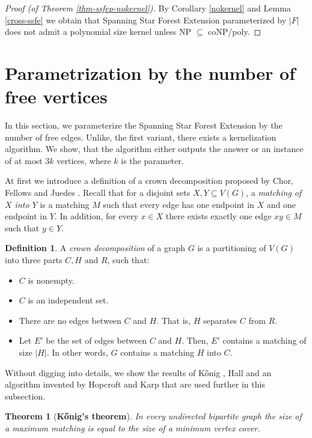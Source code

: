 \documentclass[en]{pracamgr}
\newtheorem{theorem}{Theorem}
\theoremstyle{definition}
\newtheorem{definition}{Definition}
\newcommand{\ssfep}{{\sc Spanning Star Forest Extension}}
\begin{document}
\begin{proof}[Proof (of Theorem \ref{thm-ssfep-nokernel})]
	By Corollary \ref{nokernel} and Lemma \ref{cross-ssfe} we obtain that \ssfep{} parameterized by $|F|$ does not admit a polynomial size kernel unless \textup{NP $\subseteq$ coNP/poly}.
\end{proof}

\section{Parametrization by the number of free vertices}

In this section, we parameterize the \ssfep{} by the number of free edges. Unlike, the first variant, there exists a kernelization algorithm. We show, that the algorithm either outputs the answer or an instance of at most $3k$ vertices, where $k$ is the parameter.

At first we introduce a definition of a crown decomposition proposed by Chor, Fellows and Juedes \cite{Crown}. Recall that for a disjoint sets $X,Y \subseteq V(G)$, a \textit{matching of $X$ into $Y$} is a matching $M$ such that every edge has one endpoint in $X$ and one endpoint in $Y$. In addition, for every $x \in X$ there exists exactly one edge $xy \in M$ such that $y \in Y$.

\begin{definition}
	A \textit{crown decomposition} of a graph $G$ is a partitioning of $V(G)$ into three parts $C,H$ and $R$, such that:
	\begin{itemize}
		\item $C$ is nonempty.
		\item $C$ is an independent set.
		\item There are no edges between $C$ and $H$. That is, $H$ separates $C$ from $R$.
		\item Let $E'$ be the set of edges between $C$ and $H$. Then, $E'$ contains a matching of size $|H|$. In other words, $G$ contains a matching $H$ into $C$.
	\end{itemize}
\end{definition}

Without digging into details, we show the results of Kőnig \cite{Konig}, Hall \cite{Hall} and an algorithm invented by Hopcroft and Karp \cite{Hopcroft-Karp} that are used further in this subsection.

\begin{theorem}[\textbf{Kőnig's theorem}]
	In every undirected bipartite graph the size of a maximum matching is equal to the size of a minimum vertex cover.
\end{theorem}
\end{document}
